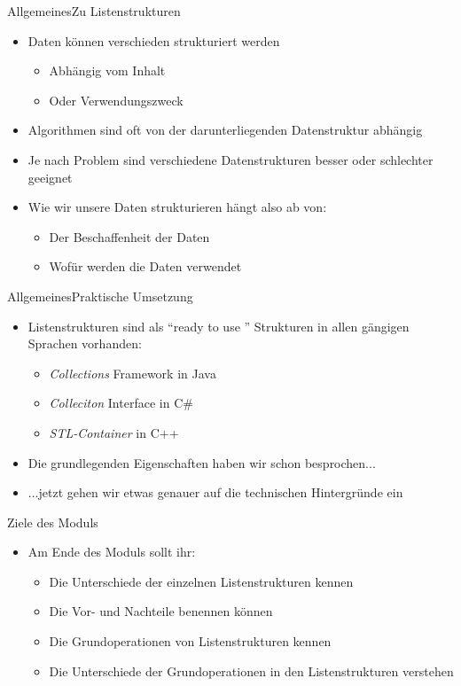 \begin{frame}{Allgemeines}{Zu Listenstrukturen}
	\begin{itemize}
		\item Daten können verschieden strukturiert werden
		\begin{itemize}
			\item Abhängig vom Inhalt
			\item Oder Verwendungszweck
		\end{itemize}
		\item Algorithmen sind oft von der darunterliegenden Datenstruktur abhängig
		\item Je nach Problem sind verschiedene Datenstrukturen besser oder schlechter geeignet
		\item Wie wir unsere Daten strukturieren hängt also ab von:
		\begin{itemize}
			\item Der Beschaffenheit der Daten
			\item Wofür werden die Daten verwendet
		\end{itemize}
	\end{itemize}
\end{frame}

\begin{frame}{Allgemeines}{Praktische Umsetzung}
	\begin{itemize}
		\item Listenstrukturen sind als "`ready to use "' Strukturen in allen gängigen Sprachen vorhanden:
		\begin{itemize}
			\item \textit{Collections} Framework in Java
			\item \textit{Colleciton} Interface in C#
			\item \textit{STL-Container} in C++
		\end{itemize}
		\item Die grundlegenden Eigenschaften haben wir schon besprochen...
		\item ...jetzt gehen wir etwas genauer auf die technischen Hintergründe ein
	\end{itemize}
\end{frame}

\begin{frame}{Ziele des Moduls}
	\begin{itemize}
		\item Am Ende des Moduls sollt ihr:
		\begin{itemize}
			\item Die Unterschiede der einzelnen Listenstrukturen kennen
			\item Die Vor- und Nachteile benennen können
			\item Die Grundoperationen von Listenstrukturen kennen
			\item Die Unterschiede der Grundoperationen in den Listenstrukturen verstehen
		\end{itemize}
	\end{itemize}
\end{frame}

